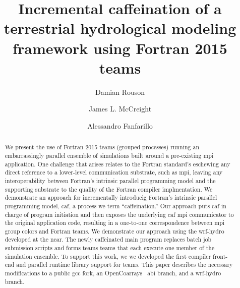 \documentclass[sigconf, authordraft]{acmart}
\begin{document}
\title{Incremental caffeination of a terrestrial hydrological modeling framework using Fortran 2015 teams}


\author{Damian Rouson}
\renewcommand{\shortauthors}{D. Rouson et al.}

\author{James L. McCreight}

\author{Alessandro Fanfarillo}

\begin{abstract}
We present the use of Fortran 2015 teams (grouped processes) running an embarrassingly
parallel ensemble of simulations built around a pre-existing \gls{mpi} application.  One
challenge that arises relates to the Fortran standard's eschewing any direct reference to
a lower-level communication substrate, such as \gls{mpi}, leaving any interoperability
between Fortran's intrinsic parallel programming model and the supporting substrate to
the quality of the Fortran compiler implmentation.  We demonstrate an approach for
incrementally introducig Fortran's intrinsic parallel programming model, \gls{caf}, a process
we term ``caffeination.''  Our approach puts \gls{caf} in charge of program initiation and
then exposes the underlying \gls{caf} \gls{mpi} communicator to the original application
code,  resulting in a one-to-one correspondence between \gls{mpi} group colors and Fortran
teams.  We demonstrate our approach using the \gls{wrf-hydro} developed at the \gls{ncar}.
The newly caffeinated main program replaces batch job submission scripts and forms teams
teams that each execute one member of the simulation ensemble.   To support this work, we
we developed the first compiler front-end and parallel runtime library support for teams.
This paper describes the necessary modifications to a public \gls{gcc} fork, an
OpenCoarrays~\cite{fanfarillo2014opencoarrays} \gls{abi} branch, and a \gls{wrf-hydro} branch.
\end{abstract}
\end{document}
